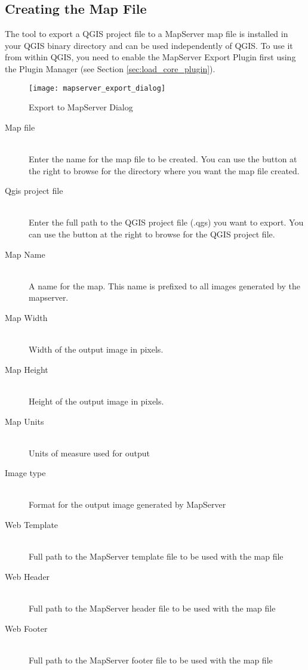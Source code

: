 \subsection{Creating the Map File}

The tool  to export a QGIS project file to a MapServer map
file is installed in your QGIS binary directory and can be used independently of QGIS.
To use it from within QGIS, you need to enable the MapServer Export Plugin first using the Plugin Manager (see Section \ref{sec:load_core_plugin}).

\begin{figure}[ht]
\centering
  \texttt{[image: mapserver\_export\_dialog]}
  \caption{Export to MapServer Dialog \nixcaption}
  \label{fig:mapserver_export_dialog}
\end{figure}

\begin{description}
\item [Map file] \mbox{}\\
Enter the name for the map file to be created. You can use the button at the
right to browse for the directory where you want the map file created.
\item [Qgis project file] \mbox{}\\
Enter the full path to the QGIS project file (.qgs) you want to export. You can
use the button at the right to browse for the QGIS project file.
\item [Map Name] \mbox{}\\
A name for the map. This name is prefixed to all images generated by the mapserver.
\item [Map Width] \mbox{}\\
Width of the output image in pixels.
\item [Map Height] \mbox{}\\
Height of the output image in pixels.
\item [Map Units] \mbox{}\\
Units of measure used for output
\item [Image type] \mbox{}\\
Format for the output image generated by MapServer
\item [Web Template] \mbox{}\\
Full path to the MapServer template file to be used with the map file
\item [Web Header] \mbox{}\\
Full path to the MapServer header file to be used with the map file
\item [Web Footer] \mbox{}\\
Full path to the MapServer footer file to be used with the map file
\end{description}

